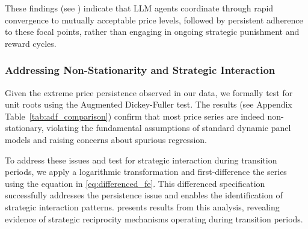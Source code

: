 These findings (see ) indicate that LLM agents coordinate through rapid convergence to mutually acceptable price levels, followed by persistent adherence to these focal points, rather than engaging in ongoing strategic punishment and reward cycles.

\subsubsection*{Addressing Non-Stationarity and Strategic Interaction}

Given the extreme price persistence observed in our data, we formally test for unit roots using the Augmented Dickey-Fuller test. The results (see Appendix Table~\ref{tab:adf_comparison}) confirm that most price series are indeed non-stationary, violating the fundamental assumptions of standard dynamic panel models and raising concerns about spurious regression.

To address these issues and test for strategic interaction during transition periods, we apply a logarithmic transformation and first-difference the series using the equation in \eqref{eq:differenced_fe}. This differenced specification successfully addresses the persistence issue and enables the identification of strategic interaction patterns.  presents results from this analysis, revealing evidence of strategic reciprocity mechanisms operating during transition periods.

